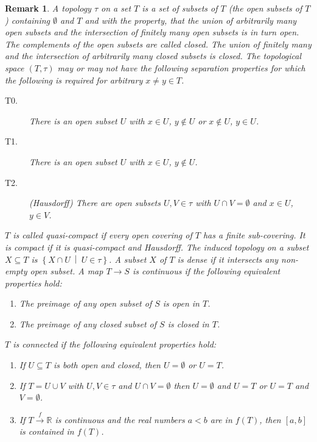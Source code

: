 \documentclass[DIV=14,parskip=full,pointednumbers]{scrartcl}
\newenvironment{alphanumerate}{\begin{enumerate}[label={$(\alph*)$},ref=\curthm]}{\end{enumerate}}
\theoremstyle{cthm}
\theoremstyle{cvarthm}
\theoremstyle{cdef}
\newtheorem*{rem*}{Remark}
\newcommand{\IR}{\mathbb{R}}
\newcommand{\longto}{\longrightarrow}
\newcommand{\morphism}[1][]{\overset{#1}{\longto}}
\newcommand{\st}{\ \middle|\ }
\begin{document}
	\begin{rem*}
		A \emph{topology} $\tau$ on a set $T$ is a set of subsets of $T$ (the \emph{open} subsets of $T$) containing $\emptyset$ and $T$ and with the property, that the union of arbitrarily many open subsets and the intersection of finitely many open subsets is in turn open. The complements of the open subsets are called \emph{closed}. The union of finitely many and the intersection of arbitrarily many closed subsets is closed. The topological space $(T,\tau)$ may or may not have the following separation properties for which the following is required for arbitrary $x\neq y\in T$.
		\begin{description}
			\item [T0.] There is an open subset $U$ with $x\in U$, $y\not\in U$ or $x\not\in U$, $y\in U$.
			\item[T1.] There is an open subset $U$ with $x\in U$, $y\not\in U$.
			\item[T2.](Hausdorff) There are open subsets $U,V\in\tau$ with $U\cap V =\emptyset$ and $x\in U$, $y\in V$. 
		\end{description}
		$T$ is called \emph{quasi-compact} if every open covering of $T$ has a finite sub-covering. It is \emph{compact} if it is quasi-compact and Hausdorff. The \emph{induced topology} on a subset $X\subseteq T$ is $\left\{X\cap U\st U\in\tau\right\}$. A subset $X$ of $T$ is dense if it intersects any non-empty open subset. A map $T\to S$ is \emph{continuous} if the following equivalent properties hold:
		\begin{alphanumerate}
			\item The preimage of any open subset of $S$ is open in $T$.
			\item The preimage of any closed subset of $S$ is closed in $T$.
		\end{alphanumerate}
		$T$ is \emph{connected} if the following equivalent properties hold:
		\begin{alphanumerate}
			\item If $U\subseteq T$ is both open and closed, then $U = \emptyset$ or $U=T$. 
			\item If $T=U\cup V$ with $U,V\in\tau$ and $U\cap V=\emptyset$ then $U=\emptyset$ and $U= T$ or $U= T$ and $V=\emptyset$.
			\item If $T\morphism[f] \IR$ is continuous and the real numbers $a<b$ are in $f(T)$, then $[a,b]$ is contained in $f(T)$.
		\end{alphanumerate}
		
	\end{rem*}
	
\end{document}
